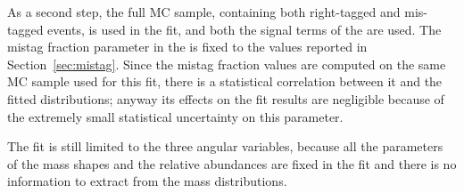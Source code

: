 


As a second step, the full MC sample, containing both right-tagged and mis-tagged events, is used in the fit, and both the signal terms of the \pdf are used.
The mistag fraction parameter in the \pdf is fixed to the values reported in Section~\ref{sec:mistag}.
Since the mistag fraction values are computed on the same MC sample used for this fit, there is a statistical correlation between it and the fitted distributions; anyway its effects on the fit results are negligible because of the extremely small statistical uncertainty on this parameter.

The fit is still limited to the three angular variables, because all the parameters of the mass shapes and the relative abundances are fixed in the fit and there is no information to extract from the mass distributions.

